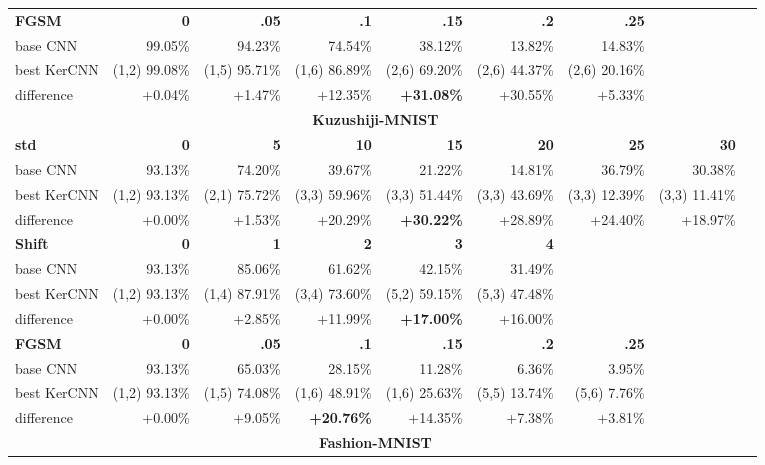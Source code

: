 \documentclass[11pt,oneside,reqno]{amsart}
\begin{document}
{\begin{table}[htbp!]
\begin{tabular}{@{}lrrrrrrrr@{}}
    \textbf{FGSM } & \textbf{0} & \textbf{.05} & \textbf{.1} & \textbf{.15} & \textbf{.2} & \textbf{.25} & \\
    base CNN & 99.05\% & 94.23\% & 74.54\% & 38.12\% & 13.82\% & 14.83\% & \\ 
    best KerCNN & (1,2) 99.08\% & (1,5) 95.71\% & (1,6) 86.89\% & (2,6) 69.20\% & (2,6) 44.37\% & (2,6) 20.16\% & \\
    difference & +0.04\% & +1.47\% & +12.35\% & \textbf{+31.08\%} & +30.55\% & +5.33\% & \\
     \midrule
      \multicolumn{8}{c}{\textbf{Kuzushiji-MNIST}}\vspace{5pt}\\
      \textbf{std } & \textbf{0} & \textbf{5} & \textbf{10} & \textbf{15} & \textbf{20} & \textbf{25} & \textbf{30} \\
      base CNN & 93.13\% & 74.20\% & 39.67\% & 21.22\% & 14.81\% & 36.79\% & 30.38\% \\ 
      best KerCNN & (1,2) 93.13\% & (2,1) 75.72\% & (3,3) 59.96\% & (3,3) 51.44\% & (3,3) 43.69\% & (3,3) 12.39\% & (3,3) 11.41\% \\
      difference & +0.00\% & +1.53\% & +20.29\% & \textbf{+30.22\%} & +28.89\% & +24.40\% & +18.97\% \vspace{5pt}\\ 
     \textbf{Shift } & \textbf{0} & \textbf{1} & \textbf{2} & \textbf{3} & \textbf{4} & & \\
   base CNN    & 93.13\% & 85.06\% & 61.62\% & 42.15\% & 31.49\% & & \\ 
    best KerCNN & (1,2) 93.13\% & (1,4) 87.91\% & (3,4) 73.60\% & (5,2) 59.15\% & (5,3) 47.48\% & & \\
    difference & +0.00\% & +2.85\% & +11.99\% & \textbf{+17.00\%} & +16.00\% & & \vspace{5pt}\\
    \textbf{FGSM } & \textbf{0} & \textbf{.05} & \textbf{.1} & \textbf{.15} & \textbf{.2} & \textbf{.25} & \\
   base CNN    & 93.13\% & 65.03\% & 28.15\% & 11.28\% & 6.36\% & 3.95\% & \\ 
    best KerCNN & (1,2) 93.13\% & (1,5) 74.08\% & (1,6) 48.91\% & (1,6) 25.63\% & (5,5) 13.74\% & (5,6) 7.76\% & \\
    difference & +0.00\% & +9.05\% & \textbf{+20.76\%} & +14.35\% & +7.38\% & +3.81\% & \\
    \midrule
      \multicolumn{8}{c}{\textbf{Fashion-MNIST}}\vspace{5pt}\\

\end{tabular}
\end{table}}
\end{document}
